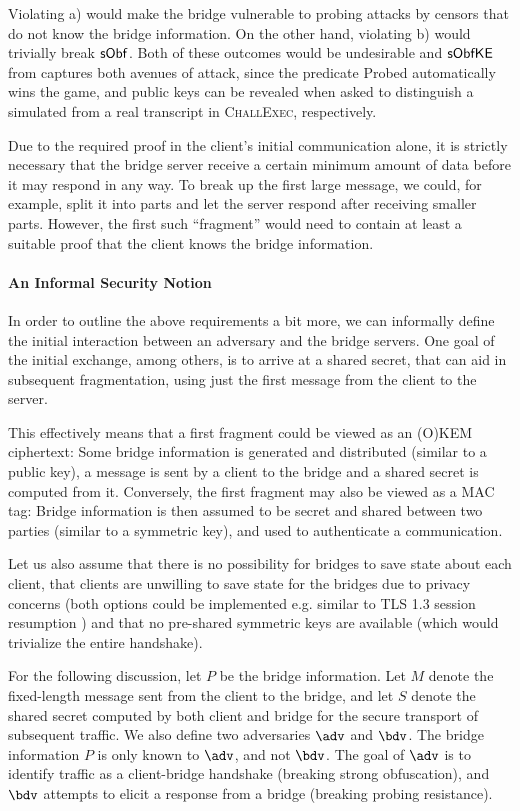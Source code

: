 Violating a) would make the bridge vulnerable to probing attacks by censors that do not know the bridge information. On the other hand, violating b) would trivially break $\mathsf{sObf}$. Both of these outcomes would be undesirable and $\mathsf{sObfKE}$ from \cite{CCS:GunSteVei24} captures both avenues of attack, since the predicate \textsf{Probed} automatically wins the game, and public keys can be revealed when asked to distinguish a simulated from a real transcript in \textsc{ChallExec}, respectively.

Due to the required proof in the client's initial communication alone, it is strictly necessary that the bridge server receive a certain minimum amount of data before it may respond in any way.
To break up the first large \drivel{} message, we could, for example, split it into parts and let the server respond after receiving smaller parts. However, the first such ``fragment'' would need to contain at least a suitable proof that the client knows the bridge information.

\paragraph{An Informal Security Notion}
In order to outline the above requirements a bit more, we can informally define the initial interaction between an adversary and the bridge servers. One goal of the initial exchange, among others, is to arrive at a shared secret, that can aid in subsequent fragmentation, using just the first message from the client to the server.

This effectively means that a first fragment could be viewed as an (O)KEM ciphertext: Some bridge information is generated and distributed (similar to a public key), a message is sent by a client to the bridge and a shared secret is computed from it.
Conversely, the first fragment may also be viewed as a MAC tag: Bridge information is then assumed to be secret and shared between two parties (similar to a symmetric key), and used to authenticate a communication.

Let us also assume that there is no possibility for bridges to save state about each client, that clients are unwilling to save state for the bridges due to privacy concerns (both options could be implemented e.g. similar to TLS 1.3 session resumption \cite[Section~2.2]{rfc8446}) and that no pre-shared symmetric keys are available (which would trivialize the entire handshake).

For the following discussion, let $P$ be the bridge information.
Let $M$ denote the fixed-length message sent from the client to the bridge, and let $S$ denote the shared secret computed by both client and bridge for the secure transport of subsequent traffic.
We also define two adversaries $\adv$ and $\bdv$. The bridge information $P$ is only known to $\adv$, and not $\bdv$.
The goal of $\adv$ is to identify traffic as a client-bridge handshake (breaking strong obfuscation), and $\bdv$ attempts to elicit a response from a bridge (breaking probing resistance).

